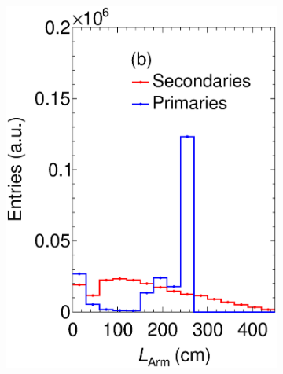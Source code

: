 \begin{figure}[t]
\begin{subfigure}[b]{0.32\textwidth}
         \includegraphics[width=\textwidth]{figures/ch5-KF_NDGAr/ToySample/testTPCMirrorLAllTall.eps}
         \caption{}
         \label{fig:LTPC}
     \end{subfigure}
          \begin{subfigure}[b]{0.32\textwidth}
         \centering

\end{subfigure}
\end{figure}
